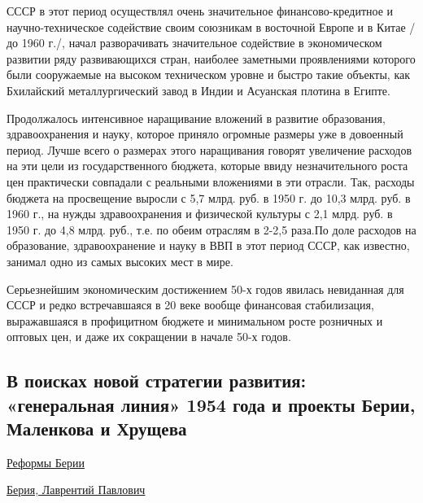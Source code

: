\documentclass{article}
\begin{document}
\hfill

СССР в этот период осуществлял очень значительное финансово-кредитное и научно-техническое содействие своим союзникам в восточной Европе и в Китае /до 1960 г./, начал разворачивать значительное содействие в экономическом развитии ряду развивающихся стран, наиболее заметными проявлениями которого были сооружаемые на высоком техническом уровне и быстро такие объекты, как Бхилайский металлургический завод в Индии и Асуанская плотина в Египте.

\hfill

Продолжалось интенсивное наращивание вложений в развитие образования, здравоохранения и науку, которое приняло огромные размеры уже в довоенный период. Лучше всего о размерах этого наращивания говорят увеличение расходов на эти цели из государственного бюджета, которые ввиду незначительного роста цен практически совпадали с реальными вложениями в эти отрасли. Так, расходы бюджета на просвещение выросли с 5,7 млрд. руб. в 1950 г. до 10,3 млрд. руб. в 1960 г., на нужды здравоохранения и физической культуры с 2,1 млрд. руб. в 1950 г. до 4,8 млрд. руб., т.е. по обеим отраслям в 2-2,5 раза.По доле расходов на образование, здравоохранение и науку в ВВП в этот период СССР, как известно, занимал одно из самых высоких мест в мире.

\hfill

Серьезнейшим экономическим достижением 50-х годов явилась невиданная для СССР и редко встречавшаяся в 20 веке вообще финансовая стабилизация, выражавшаяся в профицитном бюджете и минимальном росте розничных и оптовых цен, и даже их сокращении в начале 50-х годов.

\pagebreak
\subsection{В поисках новой стратегии развития: «генеральная линия» 1954 года и проекты Берии, Маленкова и Хрущева}

\href{https://ru.wikipedia.org/wiki/%D0%A0%D0%B5%D1%84%D0%BE%D1%80%D0%BC%D1%8B_%D0%91%D0%B5%D1%80%D0%B8%D0%B8}{Реформы Берии}

\hfill

\href{https://ru.wikipedia.org/wiki/%D0%91%D0%B5%D1%80%D0%B8%D1%8F,_%D0%9B%D0%B0%D0%B2%D1%80%D0%B5%D0%BD%D1%82%D0%B8%D0%B9_%D0%9F%D0%B0%D0%B2%D0%BB%D0%BE%D0%B2%D0%B8%D1%87#%D0%A1%D0%BC%D0%B5%D1%80%D1%82%D1%8C_%D0%A1%D1%82%D0%B0%D0%BB%D0%B8%D0%BD%D0%B0._%D0%91%D0%BE%D1%80%D1%8C%D0%B1%D0%B0_%D0%B7%D0%B0_%D0%B2%D0%BB%D0%B0%D1%81%D1%82%D1%8C}{Берия, Лаврентий Павлович}
\end{document}
